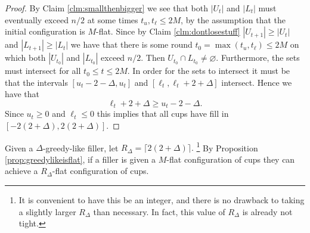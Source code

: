 \documentclass[twocolumn]{article}[10pt]
\begin{document}
\begin{proof}
  By Claim \ref{clm:smallthenbigger} we see that both $|U_t|$ and $|L_t|$ must
  eventually exceed $n/2$ at some times $t_u, t_\ell \le 2M$, by the assumption
  that the initial configuration is $M$-flat. Since by Claim
  \ref{clm:dontlosestuff} $|U_{t+1}|\ge |U_t|$ and $|L_{t+1}| \ge |L_t|$ we
  have that there is some round $t_0 =\max(t_u, t_\ell) \le 2M$ on which both
  $|U_{t_0}|$ and $|L_{t_0}|$ exceed $n/2$. Then $U_{t_0} \cap L_{t_0} \neq
  \varnothing$. Furthermore, the sets must intersect for all $t_0 \le t \le 2M$. 
  In order for the sets to intersect it must be that the intervals
  $[u_t-2-\Delta, u_t]$ and $[\ell_t, \ell_t+2+\Delta]$ intersect. Hence we have that 
  $$\ell_t+2+\Delta \ge u_t-2-\Delta.$$ Since $u_t \ge 0$ and $\ell_t \le 0$
  this implies that all cups have fill in $[-2(2+\Delta), 2(2+\Delta)]$.

\end{proof}

Given a $\Delta$-greedy-like filler, let $R_\Delta = \lceil 2(2+\Delta)
\rceil.$ \footnote{It is convenient to have this be an integer, and there is no
drawback to taking a slightly larger $R_\Delta$ than necessary. In fact, this
value of $R_\Delta$ is already not tight.}
By Proposition \ref{prop:greedylikeisflat}, if a filler is given a $M$-flat
configuration of cups they can achieve a $R_\Delta$-flat configuration of cups.
\end{document}

